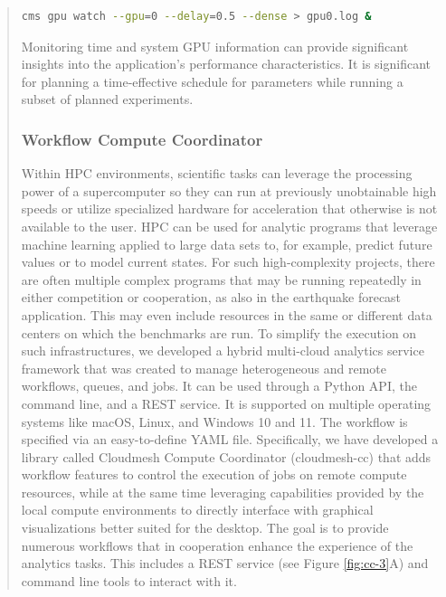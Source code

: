 \documentclass[utf8]{FrontiersinVancouver} %
\begin{document}
\begin{quote}
\begin{lstlisting}[language=sh]
    cms gpu watch --gpu=0 --delay=0.5 --dense > gpu0.log &
\end{lstlisting}


Monitoring time and system GPU information can provide significant insights into the application's performance characteristics. It is significant for planning a time-effective schedule for parameters while running a subset of planned experiments.



\subsubsection{Workflow Compute Coordinator}
\label{sec:workflow-cc}


Within HPC environments, scientific tasks can leverage the processing power of a supercomputer so they can run at previously unobtainable high speeds or utilize specialized hardware for acceleration that otherwise is not available to the user. HPC can be used for analytic programs that leverage machine learning applied to large data sets to, for example, predict future values or to model current states. For such high-complexity projects, there are often multiple complex programs that may be running repeatedly in either competition or cooperation, as also in the earthquake forecast application.  This may even include resources in the same or different data centers on which the benchmarks are run. To simplify the execution on such infrastructures, we developed a hybrid multi-cloud analytics service framework that was created to manage heterogeneous and remote workflows, queues, and jobs.  It can be used through a Python API, the command line, and a REST service. It is supported on multiple operating systems like macOS, Linux, and Windows 10 and 11.  The workflow is specified via an easy-to-define YAML file.  Specifically, we have developed a library called Cloudmesh Compute Coordinator (cloudmesh-cc) \citep{las-22-arxiv-workflow-cc} that adds workflow features to control the execution of jobs on remote compute resources, while at the same time leveraging capabilities provided by the local compute environments to directly interface with graphical visualizations better suited for the desktop. The goal is to provide numerous workflows that in cooperation enhance the experience of the analytics tasks. This includes a REST service (see Figure \ref{fig:cc-3}A) and command line tools to interact with it.



\end{quote}
\end{document}
